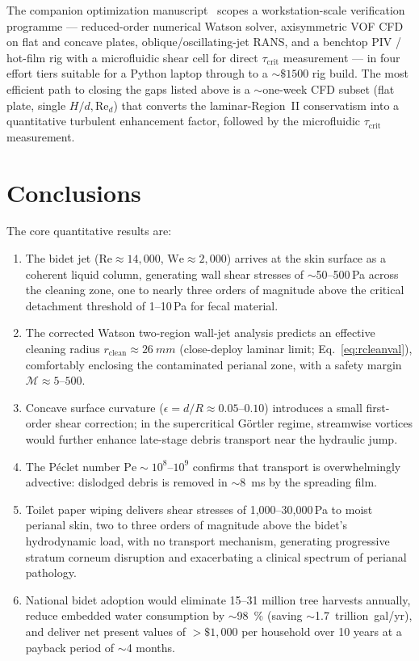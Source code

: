 \documentclass[aps,prfluids,reprint,amsmath,amssymb,floatfix]{revtex4-2}
\newcommand{\Rey}{\mathrm{Re}}
\newcommand{\We}{\mathrm{We}}
\newcommand{\Pe}{\mathrm{Pe}}
\begin{document}
The companion optimization manuscript~\citep{BurtonOptPaper} scopes a
workstation-scale verification programme --- reduced-order numerical
Watson solver, axisymmetric VOF CFD on flat and concave plates,
oblique/oscillating-jet RANS, and a benchtop PIV / hot-film rig with a
microfluidic shear cell for direct $\tau_\mathrm{crit}$ measurement ---
in four effort tiers suitable for a Python laptop through to a
$\sim$$\$$$1500$ rig build. The most efficient path to closing the gaps
listed above is a $\sim$one-week CFD subset (flat plate, single
$H/d, \Rey_d$) that converts the laminar-Region~II conservatism into a
quantitative turbulent enhancement factor, followed by the microfluidic
$\tau_\mathrm{crit}$ measurement.

\section{Conclusions}
\label{sec:conclusion}

The core quantitative results are:

\begin{enumerate}[leftmargin=*]
    \item The bidet jet ($\Rey \approx 14{,}000$, $\We \approx 2{,}000$)
    arrives at the skin surface as a coherent liquid column, generating
    wall shear stresses of $\sim$50--500\,Pa across the cleaning zone, one
    to nearly three orders of magnitude above the critical detachment
    threshold of 1--10\,Pa for fecal material.
    \item The corrected Watson two-region wall-jet analysis predicts an
    effective cleaning radius $r_\mathrm{clean} \approx \SI{26}{mm}$
    (close-deploy laminar limit; Eq.~\eqref{eq:rcleanval}),
    comfortably enclosing the contaminated perianal zone, with a safety
    margin $\mathcal{M} \approx 5$--$500$.
    \item Concave surface curvature ($\epsilon = d/R \approx 0.05$--$0.10$)
    introduces a small first-order shear correction; in the supercritical
    G\"ortler regime, streamwise vortices would further enhance late-stage
    debris transport near the hydraulic jump.
    \item The P\'{e}clet number $\Pe \sim 10^{8}$--$10^{9}$ confirms that
    transport is overwhelmingly advective: dislodged debris is removed in
    $\sim$\SI{8}{ms} by the spreading film.
    \item Toilet paper wiping delivers shear stresses of 1{,}000--30{,}000\,Pa
    to moist perianal skin, two to three orders of magnitude above the
    bidet's hydrodynamic load, with no transport mechanism, generating
    progressive stratum corneum disruption and exacerbating a clinical
    spectrum of perianal pathology.
    \item National bidet adoption would eliminate 15--31 million tree
    harvests annually, reduce embedded water consumption by
    $\sim$\SI{98}{\percent} (saving $\sim$\SI{1.7}{trillion gal/yr}), and
    deliver net present values of $>\$1{,}000$ per household over 10 years
    at a payback period of $\sim$4 months.
\end{enumerate}
\end{document}
